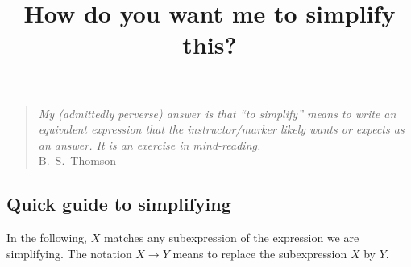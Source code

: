 \documentclass[12pt,fleqn]{article}
\title{How do you want me to simplify this?}
\begin{document}
\maketitle
\begin{quote}
\emph{My (admittedly perverse) answer is that ``to simplify''  means to write an 
equivalent expression that the instructor/marker likely wants or expects as an answer. It is an exercise in mind-reading.} \\  \phantom{xxxxx} \hfill   {\mbox{\sc B.\ S.\ Thomson}}
\end{quote}


\subsection*{Quick guide to simplifying}

In the following, $X$ matches any subexpression of the expression
we are simplifying. The notation $X \to Y$  means to replace
the subexpression $X$ by $Y$.
\end{document}
